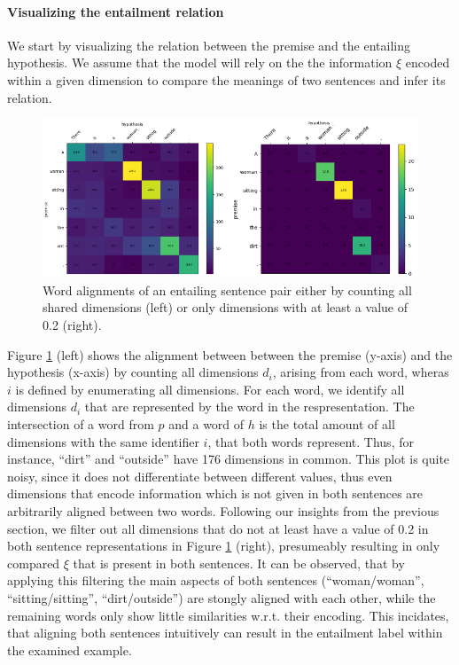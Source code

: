 \paragraph*{Visualizing the entailment relation}
We start by visualizing the relation between the premise and the entailing hypothesis. We assume that the model will rely on the the information $\xi$ encoded within a given dimension to compare the meanings of two sentences and infer its relation. 
\begin{figure}[tph!]
\centering
	\includegraphics[totalheight=7cm]{fig/alignment_entailment_sample_general.png}
	\caption{Word alignments of an entailing sentence pair either by counting all shared dimensions (left) or only dimensions with at least a value of 0.2 (right).}
	\label{fig:alignment_entailment_sample_general}
\end{figure}
Figure \ref{fig:alignment_entailment_sample_general} (left) shows the alignment between between the premise (y-axis) and the hypothesis (x-axis) by counting all dimensions $d_i$, arising from each word, wheras $i$ is defined by enumerating all dimensions. For each word, we identify all dimensions $d_i$ that are represented by the word in the respresentation. The intersection of a word from $p$ and a word of $h$ is the total amount of all dimensions with the same identifier $i$, that both words represent. Thus, for instance, ``dirt'' and ``outside'' have 176 dimensions in common. This plot is quite noisy, since it does not differentiate between different values, thus even dimensions that encode information which is not given in both sentences are arbitrarily aligned between two words. Following our insights from the previous section, we filter out all dimensions that do not at least have a value of 0.2 in both sentence representations in Figure \ref{fig:alignment_entailment_sample_general} (right), presumeably resulting in only compared $\xi$ that is present in both sentences. It can be observed, that by applying this filtering the main aspects of both sentences (``woman/woman'', ``sitting/sitting'', ``dirt/outside'') are stongly aligned with each other, while the remaining words only show little similarities w.r.t. their encoding. This incidates, that aligning both sentences intuitively can result in the entailment label within the examined example.
\newline

